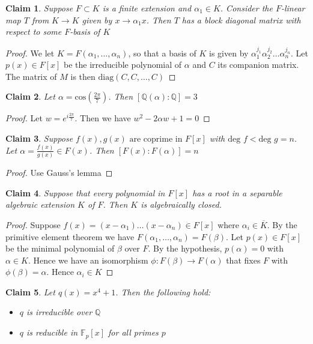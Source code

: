 \documentclass{article}
\newtheorem{claim}{Claim}
\begin{document}
\begin{claim}
  Suppose $F \subset K$ is a finite extension and $\alpha_1 \in K$. Consider the $F$-linear map $T$ from $K \to K$ given by $x \to \alpha_1 x$. 
  Then $T$ has a block diagonal matrix with respect to some $F$-basis of $K$
\end{claim}

\begin{proof}
  We let $K=F(\alpha_1,\dots,\alpha_n)$, so that a basis of $K$ is given by $\alpha_1^{j_1}\alpha_2^{j_2}\dots \alpha_n^{j_n}$. 
  Let $p(x) \in F[x]$ be the irreducible polynomial of $\alpha$ and $C$ its companion matrix. 
  The matrix of $M$ is then $\text{diag}(C,C,\dots,C)$
\end{proof}

\begin{claim}
  Let $\alpha = \text{cos}(\frac{2\pi}{7})$. Then $[\mathbb{Q}(\alpha):\mathbb{Q}]=3$
\end{claim}

\begin{proof}
  Let $w = e^{i\frac{2\pi}{7}}$. Then we have $w^2-2\alpha w +1 =0$
\end{proof}

\begin{claim}
  Suppose $f(x),g(x) \text{ are coprime in }F[x]$ with $\text{deg } f < \text{deg } g=n$. Let $\alpha=\frac{f(x)}{g(x)} \in F(x)$. Then $[F(x):F(\alpha)]=n$
\end{claim}

\begin{proof}
  Use Gauss's lemma
\end{proof}

\begin{claim}
  Suppose that every polynomial in $F[x]$ has a root in a separable algebraic extension $K$ of $F$. Then $K$ is algebraically closed.
\end{claim}

\begin{proof}
  Suppose $f(x)=(x-\alpha_1)\dots(x-\alpha_n) \in F[x]$ where $\alpha_i \in \overline{K}$. 
  By the primitive element theorem we have $F(\alpha_1, \dots,  \alpha_n)= F(\beta)$. 
  Let $p(x) \in F[x]$ be the  minimal polynomial of $\beta$ over $F$. 
  By the hypothesis, $p(\alpha)=0$ with $\alpha \in K$. 
  Hence we have an isomorphism $\phi:F(\beta) \to F(\alpha)$ that fixes $F$ with $\phi(\beta)=\alpha$. 
  Hence $\alpha_i \in K$
\end{proof}

\begin{claim}
  Let $q(x)=x^4+1$. Then the following hold:
  \begin{itemize}
    \item $q$ is irreducible over $\mathbb{Q}$
    \item $q$ is reducible in $\mathbb{F}_p[x]$ for all primes $p$
  \end{itemize}
\end{claim}
\end{document}
